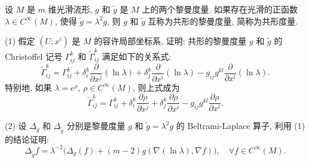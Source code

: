 \begin{exercise}[4]
  设 $M$ 是 $m$ 维光滑流形, $g$ 和 $\tilde{g}$ 是 $M$ 上的两个黎曼度量.
  如果存在光滑的正函数 $\lambda\in C^{\infty}(M)$, 使得 $\tilde{g}=\lambda^2 g$,
  则 $g$ 和 $\tilde{g}$ 互称为共形的黎曼度量, 简称为共形度量.

  (1) 假定 $(U;x^i)$ 是 $M$ 的容许局部坐标系, 证明: 共形的黎曼度量 $g$ 和 $\tilde{g}$
  的 Christoffel 记号 $\Gamma_{ij}^k$ 和 $\tilde{\Gamma}_{ij}^k$ 满足如下的关系式:
  \[\tilde{\Gamma}_{ij}^k = \Gamma_{ij}^k
    +\delta_i^k \frac{\partial}{\partial x^j}(\ln\lambda)
    +\delta_j^k \frac{\partial}{\partial x^i}(\ln\lambda)
    -g_{ij}g^{kl}\frac{\partial}{\partial x^l}(\ln\lambda).\]
  特别地, 如果 $\lambda=e^{\rho}$, $\rho\in C^{\infty}(M)$, 则上式成为
  \[\tilde{\Gamma}_{ij}^k = \Gamma_{ij}^k
    + \delta_i^k \frac{\partial\rho}{\partial x^j}
    + \delta_j^k \frac{\partial\rho}{\partial x^i}
    -g_{ij}g^{kl}\frac{\partial\rho}{\partial x^l}.\]

  (2) 设 $\Delta_g$ 和 $\Delta_{\tilde{g}}$ 分别是黎曼度量 $g$ 和 $\tilde{g}=\lambda^2g$
  的 Beltrami-Laplace 算子, 利用 (1) 的结论证明:
  \[\Delta_{\tilde{g}} f = \lambda^{-2}
    \bigl(\Delta_g(f) + (m-2)g(\nabla(\ln\lambda),\nabla f)\bigr),\quad\forall f\in C^{\infty}(M).\]
\end{exercise}

